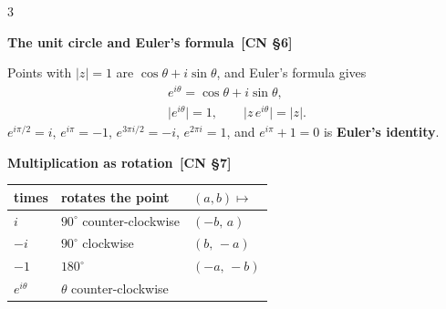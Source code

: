 \documentclass[8pt]{extarticle}
\newcommand{\sub}[1]{\par\vspace{3pt}\noindent
  {\color{RoyalBlue}\bfseries\sffamily #1}\par\vspace{0.5pt}}
\newcommand{\src}[1]{{\color{gray}\,[#1]}}
\begin{document}
\begin{multicols*}{3}
\sub{The unit circle and Euler's formula \src{CN \S6}}
Points with $\lvert z\rvert=1$ are $\cos\theta+i\sin\theta$, and Euler's formula
gives
\begin{gather*}
  e^{i\theta}=\cos\theta+i\sin\theta,\\
  \lvert e^{i\theta}\rvert=1,\qquad\lvert z\,e^{i\theta}\rvert=\lvert z\rvert .
\end{gather*}
$e^{i\pi/2}=i$, $e^{i\pi}=-1$, $e^{3\pi i/2}=-i$, $e^{2\pi i}=1$, and
$e^{i\pi}+1=0$ is \textbf{Euler's identity}.

\sub{Multiplication as rotation \src{CN \S7}}
\begin{tabular}{@{}l l l@{}}
\toprule
times & rotates the point & $(a,b)\mapsto$ \\
\midrule
$i$        & $90^{\circ}$ counter-clockwise & $(-b,\,a)$ \\
$-i$       & $90^{\circ}$ clockwise         & $(b,\,-a)$ \\
$-1$       & $180^{\circ}$                  & $(-a,\,-b)$ \\
$e^{i\theta}$ & $\theta$ counter-clockwise   & \\
\bottomrule
\end{tabular}


\end{multicols*}
\end{document}
